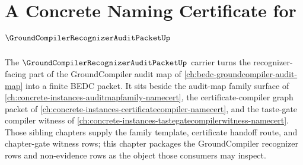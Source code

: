 \chapter{A Concrete Naming Certificate for $\GroundCompilerRecognizerAuditPacketUp$}
\label{ch:concrete-instances-groundcompilerrecognizerauditpacket-namecert}

The $\GroundCompilerRecognizerAuditPacketUp$ carrier turns the recognizer-facing part of the GroundCompiler audit map of \autoref{ch:bedc-groundcompiler-audit-map} into a finite BEDC packet. It sits beside the audit-map family surface of \autoref{ch:concrete-instances-auditmapfamily-namecert}, the certificate-compiler graph packet of \autoref{ch:concrete-instances-certificatecompiler-namecert}, and the taste-gate compiler witness of \autoref{ch:concrete-instances-tastegatecompilerwitness-namecert}. Those sibling chapters supply the family template, certificate handoff route, and chapter-gate witness rows; this chapter packages the GroundCompiler recognizer rows and non-evidence rows as the object those consumers may inspect.

